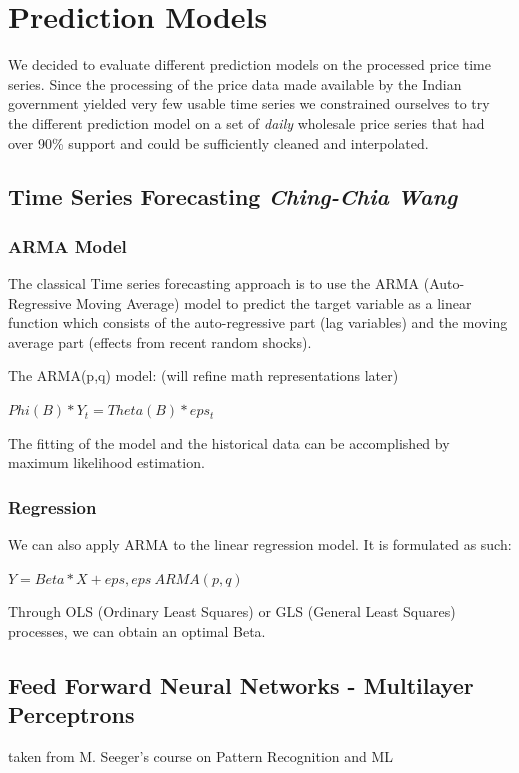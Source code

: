 \section*{Prediction Models}
We decided to evaluate different prediction models on the processed price time series. Since the processing of the price data made available by the Indian government yielded very few usable time series we constrained ourselves to try the different prediction model on a set of \emph{daily} wholesale price series that had over 90\% support and could be sufficiently cleaned and interpolated.

\subsection*{Time Series Forecasting \footnotesize\textit{Ching-Chia Wang}}

\subsubsection*{ARMA Model}
The classical Time series forecasting approach is to use the ARMA (Auto-Regressive
Moving Average) model to predict the target variable as a linear function which
consists of the auto-regressive part (lag variables) and the moving average part
(effects from recent random shocks).

The ARMA(p,q) model: (will refine math representations later)

$Phi(B) * Y_t = Theta(B) * eps_t$

The fitting of the model and the historical
data can be accomplished by maximum likelihood estimation.

\subsubsection*{Regression}
We can also apply ARMA to the linear regression model. It is formulated as such:

$Y = Beta*X + eps,   eps ~ ARMA(p,q)$

Through OLS (Ordinary Least Squares) or GLS (General Least Squares) processes,
we can obtain an optimal Beta.

\subsection*{Feed Forward Neural Networks - Multilayer Perceptrons}
taken from M. Seeger's course on Pattern Recognition and ML

